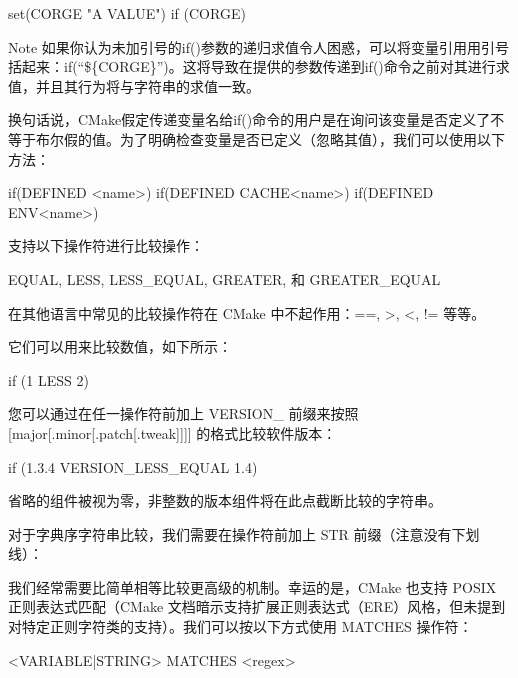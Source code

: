 \begin{cmake}
set(CORGE "A VALUE")
if (CORGE)
\end{cmake}

\begin{myNotic}{Note}
如果你认为未加引号的if()参数的递归求值令人困惑，可以将变量引用用引号括起来：if(“\$\{CORGE\}”)。这将导致在提供的参数传递到if()命令之前对其进行求值，并且其行为将与字符串的求值一致。
\end{myNotic}

换句话说，CMake假定传递变量名给if()命令的用户是在询问该变量是否定义了不等于布尔假的值。为了明确检查变量是否已定义（忽略其值），我们可以使用以下方法：

\begin{cmake}
if(DEFINED <name>)
if(DEFINED CACHE{<name>})
if(DEFINED ENV{<name>})
\end{cmake}


支持以下操作符进行比较操作：

EQUAL, LESS, LESS\_EQUAL, GREATER, 和 GREATER\_EQUAL

在其他语言中常见的比较操作符在 CMake 中不起作用：==, >, <, != 等等。

它们可以用来比较数值，如下所示：

\begin{cmake}
if (1 LESS 2)
\end{cmake}

您可以通过在任一操作符前加上 VERSION\_ 前缀来按照 [major[.minor[.patch[.tweak]]]] 的格式比较软件版本：

\begin{cmake}
if (1.3.4 VERSION_LESS_EQUAL 1.4)
\end{cmake}

省略的组件被视为零，非整数的版本组件将在此点截断比较的字符串。

对于字典序字符串比较，我们需要在操作符前加上 STR 前缀（注意没有下划线）：


我们经常需要比简单相等比较更高级的机制。幸运的是，CMake 也支持 POSIX 正则表达式匹配（CMake 文档暗示支持扩展正则表达式（ERE）风格，但未提到对特定正则字符类的支持）。我们可以按以下方式使用 MATCHES 操作符：

\begin{shell}
<VARIABLE|STRING> MATCHES <regex>
\end{shell}

